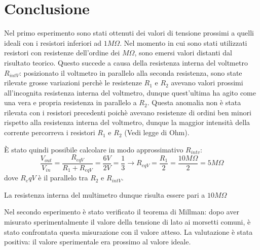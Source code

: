     \section{Conclusione}
    Nel primo esperimento sono stati ottenuti dei valori di tensione prossimi a quelli ideali con i resistori inferiori ad $1M\Omega$.
    Nel momento in cui sono stati utilizzati resistori con resistenze dell'ordine dei $M\Omega$, sono emersi valori distanti dal risultato teorico.
    Questo succede a causa della resistenza interna del voltmetro $R_{intV}$: posizionato il voltmetro in parallelo alla seconda resistenza, sono state rilevate grosse variazioni
    perchè le resistenze $R_1$ e $R_2$ avevano valori prossimi all'incognita resistenza interna del voltmetro, dunque quest'ultima ha agito come una vera e propria
    resistenza in parallelo a $R_2$. Questa anomalia non è stata rilevata con i resistori precedenti poichè avevano resistenze di ordini ben minori rispetto alla resistenza
    interna del voltmetro, dunque la maggior intensità della corrente percorreva i resistori $R_1$ e $R_2$ (Vedi legge di Ohm).\par
    È stato quindi possibile calcolare in modo approssimativo $R_{intv}$:
    \begin{equation}
        \frac{V_{out}}{V_{in}} = \frac{R_{eqV}}{R_1 + R_{eqV}} = \frac{6V}{2V} = \frac{1}{3} \longrightarrow R_{eqV} = \frac{R_1}{2} = \frac{10M\Omega}{2} = 5M\Omega
    \end{equation}
    dove $R_eqV$ è il parallelo tra $R_2$ e $R_{intV}$.\par
    La resistenza interna del multimetro dunque risulta essere pari a $10M\Omega$

    Nel secondo esperimento è stato verificato il teorema di Millman: dopo aver misurato sperimentalmente il valore della tensione di lato ai morsetti comuni,
    è stato confrontata questa misurazione con il valore atteso. La valutazione è stata positiva: il valore sperimentale era prossimo al valore ideale.

